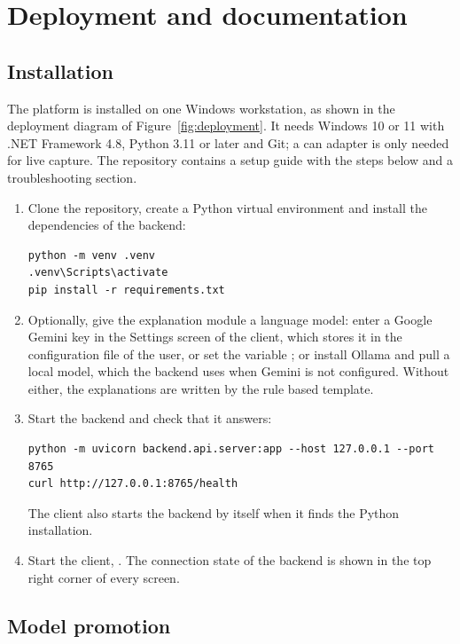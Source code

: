 \section{Deployment and documentation}
\label{sec:deployment}

\subsection{Installation}

The platform is installed on one Windows workstation, as shown in the deployment diagram of Figure~\ref{fig:deployment}. It needs Windows 10 or 11 with .NET Framework 4.8, Python 3.11 or later and Git; a \gls{can} adapter is only needed for live capture. The repository contains a setup guide with the steps below and a troubleshooting section.

\begin{enumerate}
    \item Clone the repository, create a Python virtual environment and install the dependencies of the backend:
\begin{lstlisting}[numbers=none]
python -m venv .venv
.venv\Scripts\activate
pip install -r requirements.txt
\end{lstlisting}
    \item Optionally, give the explanation module a language model: enter a Google Gemini key in the Settings screen of the client, which stores it in the configuration file of the user, or set the variable ; or install Ollama and pull a local model, which the backend uses when Gemini is not configured. Without either, the explanations are written by the rule based template.
    \item Start the backend and check that it answers:
\begin{lstlisting}[numbers=none]
python -m uvicorn backend.api.server:app --host 127.0.0.1 --port 8765
curl http://127.0.0.1:8765/health
\end{lstlisting}
    The client also starts the backend by itself when it finds the Python installation.
    \item Start the client, . The connection state of the backend is shown in the top right corner of every screen.
\end{enumerate}

\subsection{Model promotion}

